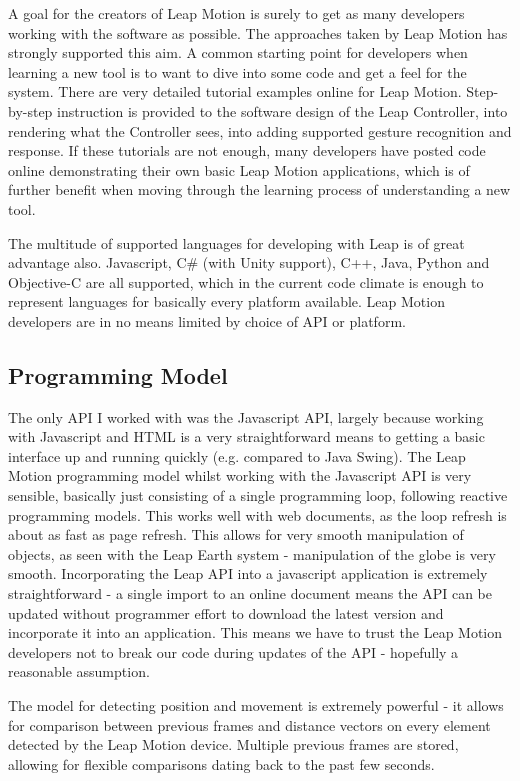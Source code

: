 \documentclass{sigplanconf}
\begin{document}
A goal for the creators of Leap Motion is surely to get as many developers working with the software as possible. The approaches taken by Leap Motion has strongly supported this aim. A common starting point for developers when learning a new tool is to want to dive into some code and get a feel for the system. There are very detailed tutorial examples online for Leap Motion. Step-by-step instruction is provided to the software design of the Leap Controller, into rendering what the Controller sees, into adding supported gesture recognition and response. If these tutorials are not enough, many developers have posted code online demonstrating their own basic Leap Motion applications, which is of further benefit when moving through the learning process of understanding a new tool. 

The multitude of supported languages for developing with Leap is of great advantage also. Javascript, C\# (with Unity support), C++, Java, Python and Objective-C are all supported, which in the current code climate is enough to represent languages for basically every platform available. Leap Motion developers are in no means limited by choice of API or platform.

\subsection{Programming Model}

The only API I worked with was the Javascript API, largely because working with Javascript and HTML is a very straightforward means to getting a basic interface up and running quickly (e.g. compared to Java Swing). The Leap Motion programming model whilst working with the Javascript API is very sensible, basically just consisting of a single programming loop, following reactive programming models. This works well with web documents, as the loop refresh is about as fast as page refresh. This allows for very smooth manipulation of objects, as seen with the Leap Earth system - manipulation of the globe is very smooth. Incorporating the Leap API into a javascript application is extremely straightforward - a single import to an online document means the API can be updated without programmer effort to download the latest version and incorporate it into an application. This means we have to trust the Leap Motion developers not to break our code during updates of the API - hopefully a reasonable assumption. 

The model for detecting position and movement is extremely powerful - it allows for comparison between previous frames and distance vectors on every element detected by the Leap Motion device. Multiple previous frames are stored, allowing for flexible comparisons dating back to the past few seconds. 
\end{document}
